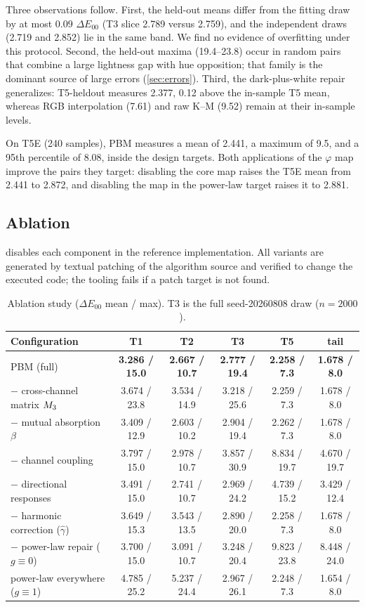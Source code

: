 Three observations follow. First, the held-out means differ from the fitting draw by at most 0.09 $\Delta E_{00}$ (T3 slice 2.789 versus 2.759), and the independent draws (2.719 and 2.852) lie in the same band. We find no evidence of overfitting under this protocol. Second, the held-out maxima (19.4--23.8) occur in random pairs that combine a large lightness gap with hue opposition; that family is the dominant source of large errors (\cref{sec:errors}). Third, the dark-plus-white repair generalizes: T5-heldout measures 2.377, 0.12 above the in-sample T5 mean, whereas RGB interpolation (7.61) and raw K--M (9.52) remain at their in-sample levels.

On T5E (240 samples), PBM measures a mean of 2.441, a maximum of 9.5, and a 95th percentile of 8.08, inside the design targets. Both applications of the $\varphi$ map improve the pairs they target: disabling the core map raises the T5E mean from 2.441 to 2.872, and disabling the map in the power-law target raises it to 2.881.

\subsection{Ablation}
\label{sec:ablation}

 disables each component in the reference implementation. All variants are generated by textual patching of the algorithm source and verified to change the executed code; the tooling fails if a patch target is not found.

\begin{table}[t]
\centering
\footnotesize
\setlength{\tabcolsep}{2.5pt}
\caption{Ablation study ($\Delta E_{00}$ mean / max). T3 is the full seed-20260808 draw ($n=2000$).}
\label{tab:ablation}
\begin{tabular}{lccccc}
\toprule
Configuration & T1 & T2 & T3 & T5 & tail \\
\midrule
PBM (full) & \textbf{3.286 / 15.0} & \textbf{2.667 / 10.7} & \textbf{2.777 / 19.4} & \textbf{2.258 / 7.3} & \textbf{1.678 / 8.0} \\
$-$ cross-channel matrix $M_{3}$ & 3.674 / 23.8 & 3.534 / 14.9 & 3.218 / 25.6 & 2.259 / 7.3 & 1.678 / 8.0 \\
$-$ mutual absorption $\beta$ & 3.409 / 12.9 & 2.603 / 10.2 & 2.904 / 19.4 & 2.262 / 7.3 & 1.678 / 8.0 \\
$-$ channel coupling & 3.797 / 15.0 & 2.978 / 10.7 & 3.857 / 30.9 & 8.834 / 19.7 & 4.670 / 19.7 \\
$-$ directional responses & 3.491 / 15.0 & 2.741 / 10.7 & 2.969 / 24.2 & 4.739 / 15.2 & 3.429 / 12.4 \\
$-$ harmonic correction ($\hat{\gamma}$) & 3.649 / 15.3 & 3.543 / 13.5 & 2.890 / 20.0 & 2.258 / 7.3 & 1.678 / 8.0 \\
$-$ power-law repair ($g\equiv0$) & 3.700 / 15.0 & 3.091 / 10.7 & 3.248 / 20.4 & 9.823 / 23.8 & 8.448 / 24.0 \\
power-law everywhere ($g\equiv1$) & 4.785 / 25.2 & 5.237 / 24.4 & 2.967 / 26.1 & 2.248 / 7.3 & 1.654 / 8.0 \\
\bottomrule
\end{tabular}
\end{table}

